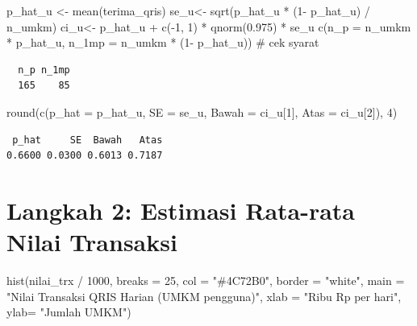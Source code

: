 \documentclass[
  indonesian,
  letterpaper,
]{book}
\newenvironment{Shaded}{\begin{snugshade}}{\end{snugshade}}
\newcommand{\AttributeTok}[1]{\textcolor[rgb]{0.40,0.45,0.13}{#1}}
\newcommand{\CommentTok}[1]{\textcolor[rgb]{0.37,0.37,0.37}{#1}}
\newcommand{\DecValTok}[1]{\textcolor[rgb]{0.68,0.00,0.00}{#1}}
\newcommand{\FloatTok}[1]{\textcolor[rgb]{0.68,0.00,0.00}{#1}}
\newcommand{\FunctionTok}[1]{\textcolor[rgb]{0.28,0.35,0.67}{#1}}
\newcommand{\NormalTok}[1]{\textcolor[rgb]{0.00,0.23,0.31}{#1}}
\newcommand{\OtherTok}[1]{\textcolor[rgb]{0.00,0.23,0.31}{#1}}
\newcommand{\SpecialCharTok}[1]{\textcolor[rgb]{0.37,0.37,0.37}{#1}}
\newcommand{\StringTok}[1]{\textcolor[rgb]{0.13,0.47,0.30}{#1}}
\begin{document}
\begin{Shaded}
\begin{Highlighting}[]
\NormalTok{p\_hat\_u }\OtherTok{\textless{}{-}} \FunctionTok{mean}\NormalTok{(terima\_qris)}
\NormalTok{se\_u}\OtherTok{\textless{}{-}} \FunctionTok{sqrt}\NormalTok{(p\_hat\_u }\SpecialCharTok{*}\NormalTok{ (}\DecValTok{1}\SpecialCharTok{{-}}\NormalTok{ p\_hat\_u) }\SpecialCharTok{/}\NormalTok{ n\_umkm)}
\NormalTok{ci\_u}\OtherTok{\textless{}{-}}\NormalTok{ p\_hat\_u }\SpecialCharTok{+} \FunctionTok{c}\NormalTok{(}\SpecialCharTok{{-}}\DecValTok{1}\NormalTok{, }\DecValTok{1}\NormalTok{) }\SpecialCharTok{*} \FunctionTok{qnorm}\NormalTok{(}\FloatTok{0.975}\NormalTok{) }\SpecialCharTok{*}\NormalTok{ se\_u}
\FunctionTok{c}\NormalTok{(}\AttributeTok{n\_p =}\NormalTok{ n\_umkm }\SpecialCharTok{*}\NormalTok{ p\_hat\_u, }\AttributeTok{n\_1mp =}\NormalTok{ n\_umkm }\SpecialCharTok{*}\NormalTok{ (}\DecValTok{1}\SpecialCharTok{{-}}\NormalTok{ p\_hat\_u)) }\CommentTok{\# cek syarat}
\end{Highlighting}
\end{Shaded}

\begin{verbatim}
  n_p n_1mp 
  165    85 
\end{verbatim}

\begin{Shaded}
\begin{Highlighting}[]
\FunctionTok{round}\NormalTok{(}\FunctionTok{c}\NormalTok{(}\AttributeTok{p\_hat =}\NormalTok{ p\_hat\_u, }\AttributeTok{SE =}\NormalTok{ se\_u, }\AttributeTok{Bawah =}\NormalTok{ ci\_u[}\DecValTok{1}\NormalTok{], }\AttributeTok{Atas =}\NormalTok{ ci\_u[}\DecValTok{2}\NormalTok{]), }\DecValTok{4}\NormalTok{)}
\end{Highlighting}
\end{Shaded}

\begin{verbatim}
 p_hat     SE  Bawah   Atas 
0.6600 0.0300 0.6013 0.7187 
\end{verbatim}

\section{Langkah 2: Estimasi Rata-rata Nilai
Transaksi}\label{langkah-2-estimasi-rata-rata-nilai-transaksi}

\begin{Shaded}
\begin{Highlighting}[]
\FunctionTok{hist}\NormalTok{(nilai\_trx }\SpecialCharTok{/} \DecValTok{1000}\NormalTok{, }\AttributeTok{breaks =} \DecValTok{25}\NormalTok{, }\AttributeTok{col =} \StringTok{"\#4C72B0"}\NormalTok{, }\AttributeTok{border =} \StringTok{"white"}\NormalTok{,}
\AttributeTok{main =} \StringTok{"Nilai Transaksi QRIS Harian (UMKM pengguna)"}\NormalTok{, }\AttributeTok{xlab =} \StringTok{"Ribu Rp per}
\StringTok{hari"}\NormalTok{,}
\AttributeTok{ylab=} \StringTok{"Jumlah UMKM"}\NormalTok{)}
\end{Highlighting}
\end{Shaded}
\end{document}
